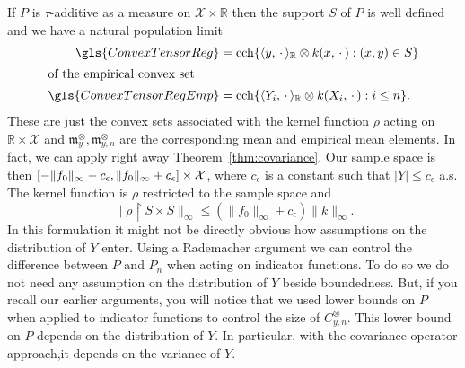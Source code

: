 \documentclass[AHL,Unicode,longabstracts,published]{cedram}
\theoremstyle{remark}
\DeclareMathOperator{\cch}{cch}
\newcommand{\restrr}
{\!\!\upharpoonright\!\!}
\newcommand{\R}{\mathbb{R}}
\newcommand{\X}{\mathcal{X}}
\newcommand{\mean}{\mathfrak{m}}
\begin{document}
If $P$ is $\tau$-additive as a measure on $\X \times \R$ then the support $S$ of $P$ is well defined and we have a natural population limit
\begin{align*}
\gls{ConvexTensorReg} &= \cch \{
\langle y, \,\cdot\, \rangle_\R \otimes k(x,\,\cdot\,) : (x,y) \in S\}
\\
\intertext{of the empirical convex set}
\gls{ConvexTensorRegEmp} &= \cch \{ \langle Y_i, \,\cdot\, \rangle_\R \otimes k(X_i,\,\cdot\,) : i \leq n\}.
\end{align*}
These are just the convex sets associated with the kernel function $\rho$ acting on $\R \times \X$ and $\mean_y^\otimes, \mean_{y,n}^\otimes$ are the corresponding mean and empirical mean elements. In fact, we can apply right away Theorem~\ref{thm:covariance}. Our sample space is then $[- \|f_0\|_\infty - c_\epsilon,\linebreak \|f_0\|_\infty + c_\epsilon] \times \X$, where $c_\epsilon$ is a constant such that $|Y| \leq c_\epsilon$ a.s. The kernel function is $\rho$ restricted to the sample space and
\[
\|\rho \restrr S \times S \|_\infty \leq (\|f_0\|_\infty + c_\epsilon) \|k\|_\infty.
\]
In this formulation it might not be directly obvious how assumptions on the distribution of $Y$ enter. Using a Rademacher argument we can control the difference between $P$ and $P_n$ when acting on indicator functions. To do so we do not need any assumption on the distribution of $Y$ beside boundedness. But, if you recall our earlier arguments, you will notice that we used lower bounds on $P$ when applied to indicator functions to control the size of $C^\otimes_{y,n}$. This lower bound on $P$ depends on the distribution of $Y$. In particular, with the covariance operator approach,\linebreak it depends on the variance of $Y$.
\end{document}
